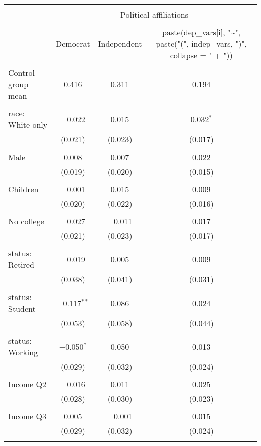 
\begin{tabular}{@{\extracolsep{5pt}}lccc} 
\\[-1.8ex]\hline 
\hline \\[-1.8ex] 
 & \multicolumn{3}{c}{Political affiliations} \\ 
\cline{2-4} 
\\[-1.8ex] & Democrat & Independent & paste(dep\_vars[i], "\textasciitilde", paste("(", indep\_vars, ")", collapse = " + ")) \\ 
\hline \\[-1.8ex] 
 Control group mean & 0.416 & 0.311 & 0.194  \\ \hline \\[-1.8ex] race: White only & $-$0.022 & 0.015 & 0.032$^{*}$ \\ 
  & (0.021) & (0.023) & (0.017) \\ 
  & & & \\ 
 Male & 0.008 & 0.007 & 0.022 \\ 
  & (0.019) & (0.020) & (0.015) \\ 
  & & & \\ 
 Children & $-$0.001 & 0.015 & 0.009 \\ 
  & (0.020) & (0.022) & (0.016) \\ 
  & & & \\ 
 No college & $-$0.027 & $-$0.011 & 0.017 \\ 
  & (0.021) & (0.023) & (0.017) \\ 
  & & & \\ 
 status: Retired & $-$0.019 & 0.005 & 0.009 \\ 
  & (0.038) & (0.041) & (0.031) \\ 
  & & & \\ 
 status: Student & $-$0.117$^{**}$ & 0.086 & 0.024 \\ 
  & (0.053) & (0.058) & (0.044) \\ 
  & & & \\ 
 status: Working & $-$0.050$^{*}$ & 0.050 & 0.013 \\ 
  & (0.029) & (0.032) & (0.024) \\ 
  & & & \\ 
 Income Q2 & $-$0.016 & 0.011 & 0.025 \\ 
  & (0.028) & (0.030) & (0.023) \\ 
  & & & \\ 
 Income Q3 & 0.005 & $-$0.001 & 0.015 \\ 
  & (0.029) & (0.032) & (0.024) \\ 
  & & & \\ 

\end{tabular}
